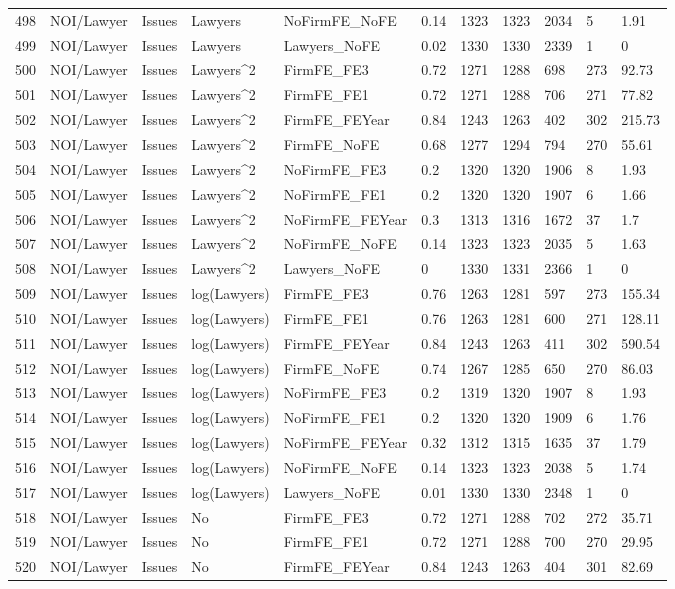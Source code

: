 \begin{table}[ht]
\begin{tabular}{rllllllllll}
  498 & NOI/Lawyer & Issues & Lawyers & NoFirmFE\_NoFE & 0.14 & 1323 & 1323 & 2034 & 5 & 1.91 \\ 
  499 & NOI/Lawyer & Issues & Lawyers & Lawyers\_NoFE & 0.02 & 1330 & 1330 & 2339 & 1 & 0 \\ 
  500 & NOI/Lawyer & Issues & Lawyers^2 & FirmFE\_FE3 & 0.72 & 1271 & 1288 & 698 & 273 & 92.73 \\ 
  501 & NOI/Lawyer & Issues & Lawyers^2 & FirmFE\_FE1 & 0.72 & 1271 & 1288 & 706 & 271 & 77.82 \\ 
  502 & NOI/Lawyer & Issues & Lawyers^2 & FirmFE\_FEYear & 0.84 & 1243 & 1263 & 402 & 302 & 215.73 \\ 
  503 & NOI/Lawyer & Issues & Lawyers^2 & FirmFE\_NoFE & 0.68 & 1277 & 1294 & 794 & 270 & 55.61 \\ 
  504 & NOI/Lawyer & Issues & Lawyers^2 & NoFirmFE\_FE3 & 0.2 & 1320 & 1320 & 1906 & 8 & 1.93 \\ 
  505 & NOI/Lawyer & Issues & Lawyers^2 & NoFirmFE\_FE1 & 0.2 & 1320 & 1320 & 1907 & 6 & 1.66 \\ 
  506 & NOI/Lawyer & Issues & Lawyers^2 & NoFirmFE\_FEYear & 0.3 & 1313 & 1316 & 1672 & 37 & 1.7 \\ 
  507 & NOI/Lawyer & Issues & Lawyers^2 & NoFirmFE\_NoFE & 0.14 & 1323 & 1323 & 2035 & 5 & 1.63 \\ 
  508 & NOI/Lawyer & Issues & Lawyers^2 & Lawyers\_NoFE & 0 & 1330 & 1331 & 2366 & 1 & 0 \\ 
  509 & NOI/Lawyer & Issues & log(Lawyers) & FirmFE\_FE3 & 0.76 & 1263 & 1281 & 597 & 273 & 155.34 \\ 
  510 & NOI/Lawyer & Issues & log(Lawyers) & FirmFE\_FE1 & 0.76 & 1263 & 1281 & 600 & 271 & 128.11 \\ 
  511 & NOI/Lawyer & Issues & log(Lawyers) & FirmFE\_FEYear & 0.84 & 1243 & 1263 & 411 & 302 & 590.54 \\ 
  512 & NOI/Lawyer & Issues & log(Lawyers) & FirmFE\_NoFE & 0.74 & 1267 & 1285 & 650 & 270 & 86.03 \\ 
  513 & NOI/Lawyer & Issues & log(Lawyers) & NoFirmFE\_FE3 & 0.2 & 1319 & 1320 & 1907 & 8 & 1.93 \\ 
  514 & NOI/Lawyer & Issues & log(Lawyers) & NoFirmFE\_FE1 & 0.2 & 1320 & 1320 & 1909 & 6 & 1.76 \\ 
  515 & NOI/Lawyer & Issues & log(Lawyers) & NoFirmFE\_FEYear & 0.32 & 1312 & 1315 & 1635 & 37 & 1.79 \\ 
  516 & NOI/Lawyer & Issues & log(Lawyers) & NoFirmFE\_NoFE & 0.14 & 1323 & 1323 & 2038 & 5 & 1.74 \\ 
  517 & NOI/Lawyer & Issues & log(Lawyers) & Lawyers\_NoFE & 0.01 & 1330 & 1330 & 2348 & 1 & 0 \\ 
  518 & NOI/Lawyer & Issues & No & FirmFE\_FE3 & 0.72 & 1271 & 1288 & 702 & 272 & 35.71 \\ 
  519 & NOI/Lawyer & Issues & No & FirmFE\_FE1 & 0.72 & 1271 & 1288 & 700 & 270 & 29.95 \\ 
  520 & NOI/Lawyer & Issues & No & FirmFE\_FEYear & 0.84 & 1243 & 1263 & 404 & 301 & 82.69 \\ 
   \hline
\end{tabular}
\end{table}

